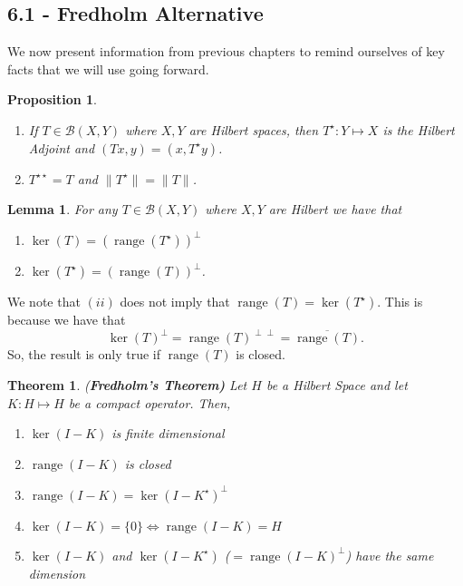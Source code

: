 \documentclass[12pt]{article}
\newtheorem{theorem}{Theorem}
\newtheorem{lemma}{Lemma}
\newtheorem{proposition}{Proposition}
\newcommand{\B}{\mathscr{B}}
\DeclareMathOperator{\range}{range}
\newcommand{\ov}{\overline}
\newcommand{\Ts}{T^{\star}}
\newcommand{\Ks}{K^{\star}}
\newcommand{\Tss}{T^{\star \star}}
\begin{document}
\subsection*{6.1 - Fredholm Alternative}
We now present information from previous chapters to remind ourselves of key facts that we will use going forward.
\begin{proposition}
\begin{enumerate}
\item[(1)] If $T \in \B(X, Y)$ where $X, Y$ are Hilbert spaces, then $\Ts: Y \mapsto X$ is the Hilbert Adjoint and $(Tx, y) = (x, \Ts y)$. 
\item[(2)] $\Tss = T$ and $\| \Ts \| = \| T \|$. 
\end{enumerate}
\end{proposition}
\begin{lemma}
For any $T \in \B(X, Y)$ where $X, Y$ are Hilbert we have that 
\begin{enumerate}[topsep=-15pt, itemsep=0pt]
\item[(i)] $\ker(T) = \left( \range(\Ts) \right)^{\perp}$
\item[(ii)] $ \ker(\Ts) = \left( \range(T) \right)^{\perp}$.
\end{enumerate}
\end{lemma}
\vspace{-20pt}
We note that $(ii)$ does not imply that $\range(T) = \ker(\Ts)$. This is because we have that
\[ \ker(T)^{\perp} = \range(T)^{\perp \perp} = \ov{\range(T)}. \]
So, the result is only true if $\range(T)$ is closed. 
\begin{theorem}(\textbf{Fredholm's Theorem)} Let $H$ be a Hilbert Space and let $K: H \mapsto H$ be a compact operator. Then, 
\begin{enumerate}[topsep=-15pt, itemsep=0pt]
\item[(i)] $\ker(I - K)$ is finite dimensional
\item[(ii)] $\range(I - K)$ is closed
\item[(iii)] $\range(I - K) = \ker(I - \Ks)^{\perp}$
\item[(iv)] $\ker(I - K) = \{ 0 \} \Longleftrightarrow \range(I - K) = H$
\item[(v)] $\ker(I - K)$ and $\ker(I - \Ks)$ ($= \range(I - K)^{\perp}$) have the same dimension 
\end{enumerate}
\end{theorem}
\vspace{-20pt}
\end{document}
